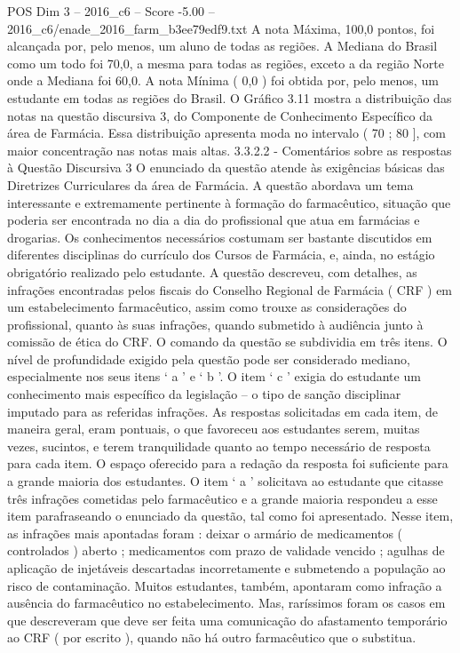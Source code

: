 \begin{textsample}{POS Dim 3 – 2016\_c6 – Score -5.00 – 2016\_c6/enade\_2016\_farm\_b3ee79edf9.txt}
A nota Máxima, 100,0 pontos, foi alcançada por, pelo menos, um aluno de todas as regiões.
A Mediana do Brasil como um todo foi 70,0, a mesma para todas as regiões, exceto a da região Norte onde a Mediana foi 60,0.
A nota Mínima ( 0,0 ) foi obtida por, pelo menos, um estudante em todas as regiões do Brasil.
O Gráfico 3.11 mostra a distribuição das notas na questão discursiva 3, do Componente de Conhecimento Específico da área de Farmácia.
Essa distribuição apresenta moda no intervalo ( 70 ; 80 ], com maior concentração nas notas mais altas. 3.3.2.2 - Comentários sobre as respostas à Questão Discursiva 3 O enunciado da questão atende às exigências básicas das Diretrizes Curriculares da área de Farmácia.
A questão abordava um tema interessante e extremamente pertinente à formação do farmacêutico, situação que poderia ser encontrada no dia a dia do profissional que atua em farmácias e drogarias.
Os conhecimentos necessários costumam ser bastante discutidos em diferentes disciplinas do currículo dos Cursos de Farmácia, e, ainda, no estágio obrigatório realizado pelo estudante.
A questão descreveu, com detalhes, as infrações encontradas pelos fiscais do Conselho Regional de Farmácia ( CRF ) em um estabelecimento farmacêutico, assim como trouxe as considerações do profissional, quanto às suas infrações, quando submetido à audiência junto à comissão de ética do CRF.
O comando da questão se subdividia em três itens.
O nível de profundidade exigido pela questão pode ser considerado mediano, especialmente nos seus itens ‘ a ’ e ‘ b ’.
O item ‘ c ’ exigia do estudante um conhecimento mais específico da legislação – o tipo de sanção disciplinar imputado para as referidas infrações.
As respostas solicitadas em cada item, de maneira geral, eram pontuais, o que favoreceu aos estudantes serem, muitas vezes, sucintos, e terem tranquilidade quanto ao tempo necessário de resposta para cada item.
O espaço oferecido para a redação da resposta foi suficiente para a grande maioria dos estudantes.
O item ‘ a ’ solicitava ao estudante que citasse três infrações cometidas pelo farmacêutico e a grande maioria respondeu a esse item parafraseando o enunciado da questão, tal como foi apresentado.
Nesse item, as infrações mais apontadas foram : deixar o armário de medicamentos ( controlados ) aberto ; medicamentos com prazo de validade vencido ; agulhas de aplicação de injetáveis descartadas incorretamente e submetendo a população ao risco de contaminação.
Muitos estudantes, também, apontaram como infração a ausência do farmacêutico no estabelecimento.
Mas, raríssimos foram os casos em que descreveram que deve ser feita uma comunicação do afastamento temporário ao CRF ( por escrito ), quando não há outro farmacêutico que o substitua.

\end{textsample}
